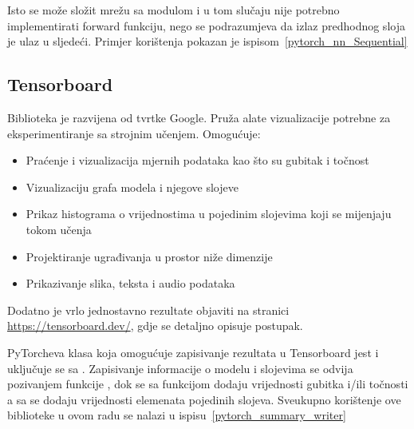 Isto se može složit mrežu sa  modulom i u tom slučaju nije potrebno implementirati forward funkciju, nego se podrazumjeva da izlaz predhodnog sloja je ulaz u sljedeći. Primjer korištenja  pokazan je ispisom~\ref{pytorch_nn_Sequential}


\subsection{Tensorboard}
Biblioteka je razvijena od tvrtke Google. Pruža alate vizualizacije potrebne za eksperimentiranje sa strojnim učenjem. 
Omogućuje:
\begin{itemize}
	\item Praćenje i vizualizacija mjernih podataka kao što su gubitak i točnost
	\item Vizualizaciju grafa modela i njegove slojeve
	\item Prikaz histograma o vrijednostima u pojedinim slojevima koji se mijenjaju tokom učenja
	\item Projektiranje ugrađivanja u prostor niže dimenzije
	\item Prikazivanje slika, teksta i audio podataka
\end{itemize}
Dodatno je vrlo jednostavno rezultate objaviti na stranici \url{https://tensorboard.dev/}, gdje se detaljno opisuje postupak.

PyTorcheva klasa koja omogućuje zapisivanje rezultata u Tensorboard jest  i uključuje se sa . Zapisivanje informacije o modelu i slojevima se odvija pozivanjem funkcije , dok se sa funkcijom  dodaju vrijednosti gubitka i/ili točnosti a sa  se dodaju vrijednosti elemenata pojedinih slojeva. Sveukupno korištenje ove biblioteke u ovom radu se nalazi u ispisu~\ref{pytorch_summary_writer}
{}

